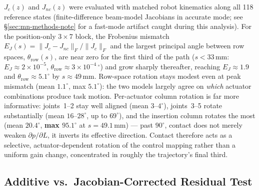 \documentclass[journal]{IEEEtran}
\begin{document}
$J_c(z)$ and $J_{nc}(z)$ were evaluated with matched robot kinematics
along all 118 reference states (finite-difference beam-model
Jacobians in accurate mode; see \S\ref{sec:mn-methods-note} for a fast-mode
artifact caught during this analysis). For the position-only $3\times7$
block, the Frobenius mismatch
$E_J(s)=\lVert J_c-J_{nc}\rVert_F/\lVert J_c\rVert_F$
and the largest principal angle between row spaces,
$\theta_{\mathrm{row}}(s)$, are near zero for the first third of the
path ($s<33\,\mathrm{mm}$: $E_J\approx2\times10^{-5}$,
$\theta_{\mathrm{row}}\approx3\times10^{-4}\,{}^\circ$) and grow
sharply thereafter, reaching $E_J\approx1.9$ and
$\theta_{\mathrm{row}}\approx5.1^\circ$ by $s\approx49\,\mathrm{mm}$.
Row-space rotation stays modest even at peak mismatch (mean
$1.1^\circ$, max $5.1^\circ$): the two models largely agree on
\emph{which} actuator combinations produce task motion. Per-actuator
column rotation is far more informative: joints~1--2 stay well aligned
(mean $3$--$4^\circ$), joints~3--5 rotate substantially (mean
$16$--$28^\circ$, up to $69^\circ$), and the insertion column rotates
the most (mean $20.4^\circ$, \textbf{max $95.1^\circ$} at
$s=49.1\,\mathrm{mm}$) --- past $90^\circ$, contact does not merely
weaken $\partial p/\partial L$, it inverts its effective direction.
Contact therefore acts as a selective, actuator-dependent rotation of
the control mapping rather than a uniform gain change, concentrated in
roughly the trajectory's final third.

\subsection{Additive vs.\ Jacobian-Corrected Residual Test}
\label{sec:mn-exp2}
\end{document}
